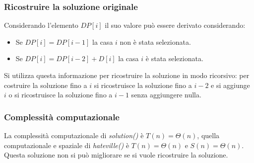 \subsubsection{Ricostruire la soluzione originale}
Considerando l'elemento $DP[i]$ il suo valore pu\`o essere derivato considerando:
\begin{itemize}
\item Se $DP[i]=DP[i-1]$ la casa $i$ non \`e stata selezionata.
\item Se $DP[i]=DP[i-2]+D[i]$ la casa $i$ \`e stata selezionata.
\end{itemize}
Si utilizza questa informazione per ricostruire la soluzione in modo ricorsivo: per costruire la soluzione fino a $i$ si ricostruisce la soluzione fino a $i-2$ e si aggiunge $i$ o si ricostruisce la soluzione fino a $i-1$ 
senza aggiungere nulla. 
\begin{algorithm}[H]
\DontPrintSemicolon
{}




\SetKwFunction{}{}
\SetKwFunction{}{}
\SetKwFunction{}{}

\caption{\protect\Set \protect{}}
\end{algorithm}
\subsubsection{Complessit\`a computazionale}
La complessit\`a computazionale di \emph{solution()} \`e $T(n)=\Theta(n)$, quella computazionale e spaziale di \emph{hateville()} \`e $T(n)=\Theta(n)$ e $S(n)=\Theta(n)$. Questa soluzione non si pu\`o 
migliorare se si vuole ricostruire la soluzione.
